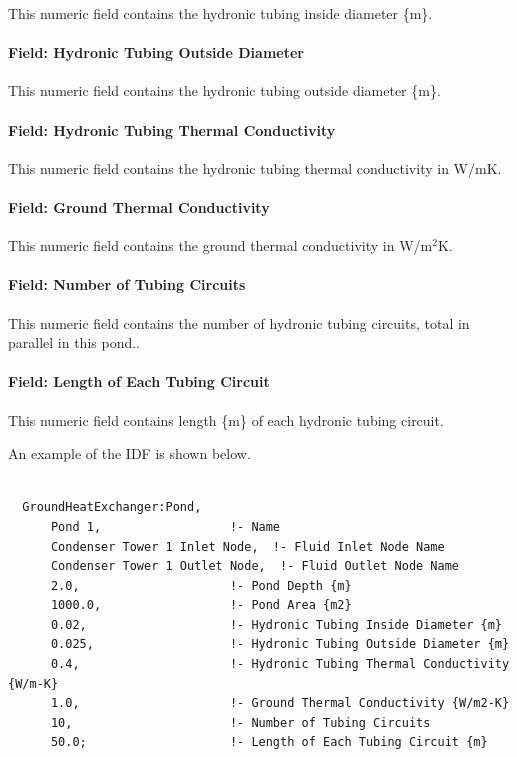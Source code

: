 This numeric field contains the hydronic tubing inside diameter \{m\}.

\paragraph{Field: Hydronic Tubing Outside Diameter}\label{field-hydronic-tubing-outside-diameter}

This numeric field contains the hydronic tubing outside diameter \{m\}.

\paragraph{Field: Hydronic Tubing Thermal Conductivity}\label{field-hydronic-tubing-thermal-conductivity}

This numeric field contains the hydronic tubing thermal conductivity in W/mK.

\paragraph{Field: Ground Thermal Conductivity}\label{field-ground-thermal-conductivity-1}

This numeric field contains the ground thermal conductivity in W/m\(^{2}\)K.

\paragraph{Field: Number of Tubing Circuits}\label{field-number-of-tubing-circuits}

This numeric field contains the number of hydronic tubing circuits, total in parallel in this pond..

\paragraph{Field: Length of Each Tubing Circuit}\label{field-length-of-each-tubing-circuit}

This numeric field contains length \{m\} of each hydronic tubing circuit.

An example of the IDF is shown below.

\begin{lstlisting}

  GroundHeatExchanger:Pond,
      Pond 1,                  !- Name
      Condenser Tower 1 Inlet Node,  !- Fluid Inlet Node Name
      Condenser Tower 1 Outlet Node,  !- Fluid Outlet Node Name
      2.0,                     !- Pond Depth {m}
      1000.0,                  !- Pond Area {m2}
      0.02,                    !- Hydronic Tubing Inside Diameter {m}
      0.025,                   !- Hydronic Tubing Outside Diameter {m}
      0.4,                     !- Hydronic Tubing Thermal Conductivity {W/m-K}
      1.0,                     !- Ground Thermal Conductivity {W/m2-K}
      10,                      !- Number of Tubing Circuits
      50.0;                    !- Length of Each Tubing Circuit {m}
\end{lstlisting}

